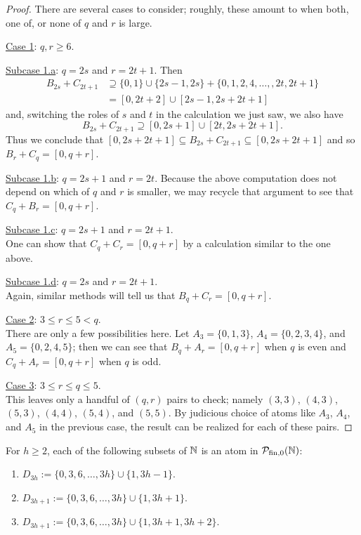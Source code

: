 \begin{proof}
	There are several cases to consider; roughly, these amount to when both, one of, or none of $q$ and $r$ is large.
	
	\underline{Case 1}: $q,r \ge 6$. 
	
	\underline{Subcase 1.a}: $q = 2s$ and $r = 2t+1$.
	Then 
	\begin{align*}
	B_{2s} + C_{2t+1} 
	&\supseteq \{0,1\}\cup\{2s-1,2s\} + \{0,1,2,4,\dots, ,2t,2t+1\} \\
	&= [ 0, 2t+2 ] \cup [ 2s-1,2s+2t+1 ]
	\end{align*}
	and, switching the roles of $s$ and $t$ in the calculation we just saw, we also have 
	\[B_{2s}+C_{2t+1} \supseteq [ 0,2s+1 ] \cup [ 2t,2s+2t+1 ].\]
	Thus we conclude that $[ 0,2s+2t+1 ] \subseteq B_{2s}+C_{2t+1} \subseteq [ 0,2s+2t+1 ]$ and so $B_r + C_q = [ 0,q+r ]$.
	
	\underline{Subcase 1.b}: $q = 2s+1$ and $r = 2t$.
	Because the above computation does not depend on which of $q$ and $r$ is smaller, we may recycle that argument to see that $C_q + B_r = [ 0,q+r ]$.
	
	\underline{Subcase 1.c}: $q = 2s+1$ and $r = 2t+1$.\\
	One can show that $C_q + C_r = [ 0,q+r ]$ by a calculation similar to the one above.
	
	\underline{Subcase 1.d}: $q = 2s$ and $r = 2t+1$. \\
	Again, similar methods will tell us that $B_q + C_r = [ 0,q+r ]$.
	
	\underline{Case 2}: $3 \le r \le 5 < q$.\\
	There are only a few possibilities here.
	Let $A_3 = \{0,1,3\}$, $A_4 = \{0,2,3,4\}$, and $A_5 = \{0,2,4,5\}$; then we can see that $B_q +A_r = [ 0,q+r ]$ when $q$ is even and $C_q + A_r = [ 0,q+r ]$ when $q$ is odd.
	
	\underline{Case 3}: $3\le r\le q \le 5$.\\
	This leaves only a handful of $(q,r)$ pairs to check; namely $(3,3)$, $(4,3)$, $(5,3)$, $(4,4)$, $(5,4)$, and $(5,5)$.
	By judicious choice of atoms like $A_3$, $A_4$, and $A_5$ in the previous case, the result can be realized for each of these pairs.
\end{proof}

\begin{prop} \label{prop:3-congruence atoms}
	For $h\ge 2$, each of the following subsets of $\mathbb{N}$ is an atom in ${\mathcal{P}_{\textrm{fin},0}(\mathbb{N})}$:
	\begin{enumerate}[label={\rm (\roman{*})}]
		\item $D_{3h} := \{0,3,6,\dots, 3h\} \cup \{ 1, 3h-1 \}$.
		\item $D_{3h+1} := \{0,3,6,\dots, 3h\} \cup \{ 1, 3h+1 \}$.
		\item $D_{3h+1} := \{0,3,6,\dots, 3h\} \cup \{ 1, 3h+1, 3h+2 \}$.
	\end{enumerate}
\end{prop}

